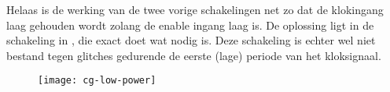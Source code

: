Helaas is de werking van de twee vorige schakelingen net zo dat de klokingang laag gehouden wordt zolang de enable ingang laag is. De oplossing ligt in de schakeling in , die exact doet wat nodig is. Deze schakeling is echter wel niet bestand tegen glitches gedurende de eerste (lage) periode van het kloksignaal.

\begin{figure}[h]
	\centering
		\texttt{[image: cg-low-power]}
		\label{figuur-implementatie-optimalisatie-cg-low-power}
\end{figure}
